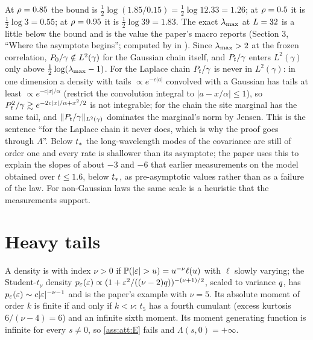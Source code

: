 At $\rho=0.85$ the bound is $\tfrac12\log(1.85/0.15)=\tfrac12\log12.33=1.26$; at
$\rho=0.5$ it is $\tfrac12\log3=0.55$; at $\rho=0.95$ it is $\tfrac12\log39=1.83$.
The exact $\lambda_{\max}$ at $L=32$ is a little below the bound and is the value the
paper's macro reports (Section 3, ``Where the asymptote begins''; computed by
 in ). Since $\lambda_{\max}>2$ at the
frozen correlation, $P_0/\gamma\notin L^2(\gamma)$ for the Gaussian chain itself, and
$P_t/\gamma$ enters $L^2(\gamma)$ only above $\tfrac12\log(\lambda_{\max}-1)$. For the Laplace
chain $P_t/\gamma$ is never in $L^2(\gamma)$: in one dimension a density with tails
$\propto e^{-c|a|}$ convolved with a Gaussian has tails at least $\propto e^{-c|x|/\alpha}$
(restrict the convolution integral to $|a-x/\alpha|\le1$), so $P_t^2/\gamma\gtrsim e^{-2c|x|/\alpha+x^2/2}$
is not integrable; for the chain the site marginal has the same tail, and
$\lVert P_t/\gamma\rVert_{L^2(\gamma)}$ dominates the marginal's norm by Jensen. This is
the sentence ``for the Laplace chain it never does, which is why the proof goes
through $\Lambda$''. Below $t_{*}$ the long-wavelength modes of the covariance are
still of order one and every rate is shallower than its asymptote; the paper uses this
to explain the slopes of about $-3$ and $-6$ that earlier measurements on the model
obtained over $t\le1.6$, below $t_{*}$, as pre-asymptotic values rather than as a
failure of the law. For non-Gaussian laws the same scale is a heuristic that the
measurements support.

\section{Heavy tails}
\label{sec:att:heavy}

A density is  with index $\nu>0$ if
$\Prob(|\varepsilon|>u)=u^{-\nu}\ell(u)$ with $\ell$ slowly varying; the Student-$t_\nu$
density $p_{\varepsilon}(\varepsilon)\propto(1+\varepsilon^2/((\nu-2)q))^{-(\nu+1)/2}$,
scaled to variance $q$, has $p_{\varepsilon}(\varepsilon)\sim c|\varepsilon|^{-\nu-1}$ and is
the paper's example with $\nu=5$. Its absolute moment of order $k$ is finite if and
only if $k<\nu$: $t_5$ has a fourth cumulant (excess kurtosis $6/(\nu-4)=6$) and an
infinite sixth moment. Its moment generating function is infinite for every $s\ne0$,
so \cref{ass:att:E} fails and $\Lambda(s,0)=+\infty$.

